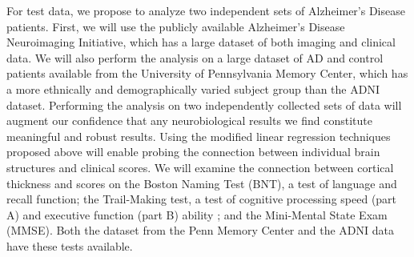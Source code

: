 \documentclass[11pt]{nih}
\begin{document}
For test data, we propose to analyze two independent sets of Alzheimer's Disease patients.  First, we will use the publicly available Alzheimer's Disease Neuroimaging Initiative, which has a large dataset of both imaging and clinical data.  We will also perform the analysis on a large dataset of AD and control patients available from the University of Pennsylvania Memory Center, which has a more ethnically and demographically varied subject group than the ADNI dataset.  Performing the analysis on two independently collected sets of data will augment our confidence that any neurobiological results we find constitute meaningful and robust results. Using the modified linear regression techniques proposed above will enable probing the connection between individual brain structures and clinical scores.  We will examine the connection between cortical thickness and scores on the Boston Naming Test (BNT), a test of language and recall function; the Trail-Making test, a test of cognitive processing speed (part A) and executive function (part B) ability \cite{bowie_administration_2006}; and the Mini-Mental State Exam (MMSE).  Both the dataset from the Penn Memory Center and the ADNI data have these tests available. 



\end{document}
